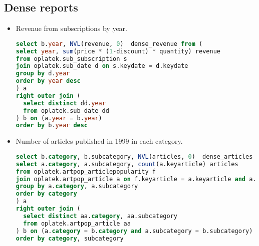 \subsection{Dense reports} %
\label{sub:Dense reports}
\begin{itemize}
\item Revenue from subscriptions by year.
\begin{lstlisting}[language=sql] 
select b.year, NVL(revenue, 0)  dense_revenue from (
select year, sum(price * (1-discount) * quantity) revenue 
from oplatek.sub_subscription s 
join oplatek.sub_date d on s.keydate = d.keydate 
group by d.year 
order by year desc
) a
right outer join (
  select distinct dd.year
  from oplatek.sub_date dd
) b on (a.year = b.year)
order by b.year desc
\end{lstlisting}

\item Number of articles published in 1999 in each category.
\begin{lstlisting}[language=sql] 
select b.category, b.subcategory, NVL(articles, 0)  dense_articles from (
select a.category, a.subcategory, count(a.keyarticle) articles
from oplatek.artpop_articlepopularity f
join oplatek.artpop_article a on f.keyarticle = a.keyarticle and a.publicationyear = 1999
group by a.category, a.subcategory
order by category
) a
right outer join (
  select distinct aa.category, aa.subcategory
  from oplatek.artpop_article aa
) b on (a.category = b.category and a.subcategory = b.subcategory)
order by category, subcategory
\end{lstlisting}
\end{itemize}

